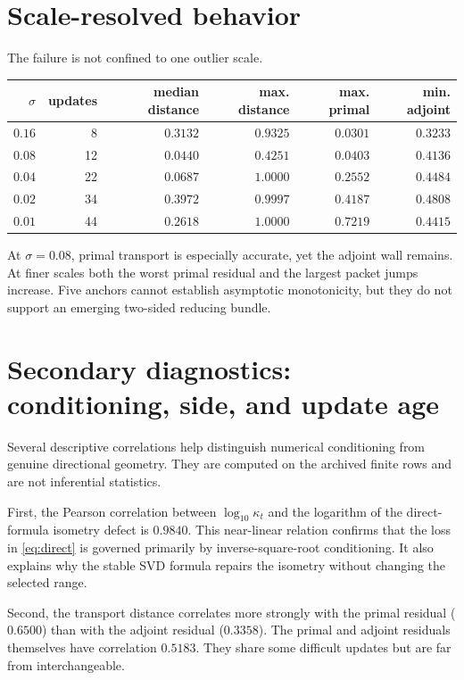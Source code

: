 \documentclass[12pt]{article}
\theoremstyle{remark}
\begin{document}
\section{Scale-resolved behavior}

The failure is not confined to one outlier scale.
\begin{center}
\begin{tabular}{rrrrrr}
\toprule
$\sigma$ & updates & median distance & max. distance & max. primal & min. adjoint\\
\midrule
$0.16$ & 8 & $0.3132$ & $0.9325$ & $0.0301$ & $0.3233$\\
$0.08$ & 12 & $0.0440$ & $0.4251$ & $0.0403$ & $0.4136$\\
$0.04$ & 22 & $0.0687$ & $1.0000$ & $0.2552$ & $0.4484$\\
$0.02$ & 34 & $0.3972$ & $0.9997$ & $0.4187$ & $0.4808$\\
$0.01$ & 44 & $0.2618$ & $1.0000$ & $0.7219$ & $0.4415$\\
\bottomrule
\end{tabular}
\end{center}
At $\sigma=0.08$, primal transport is especially accurate, yet the adjoint
wall remains.  At finer scales both the worst primal residual and the largest
packet jumps increase.  Five anchors cannot establish asymptotic monotonicity,
but they do not support an emerging two-sided reducing bundle.

\section{Secondary diagnostics: conditioning, side, and update age}

Several descriptive correlations help distinguish numerical conditioning
from genuine directional geometry.  They are computed on the archived finite
rows and are not inferential statistics.

First, the Pearson correlation between
$\log_{10}\kappa_t$ and the logarithm of the direct-formula isometry defect is
$0.9840$.  This near-linear relation confirms that the loss in
\eqref{eq:direct} is governed primarily by inverse-square-root conditioning.
It also explains why the stable SVD formula repairs the isometry without
changing the selected range.

Second, the transport distance correlates more strongly with the primal
residual ($0.6500$) than with the adjoint residual ($0.3358$).  The primal and
adjoint residuals themselves have correlation $0.5183$.  They share some
difficult updates but are far from interchangeable.
\end{document}
